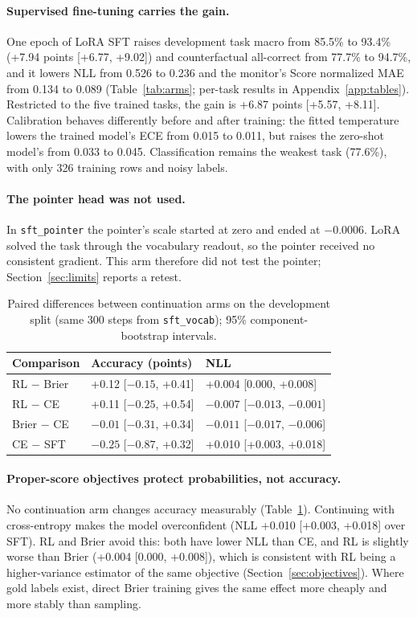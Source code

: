 \paragraph{Supervised fine-tuning carries the gain.}
One epoch of LoRA SFT raises development task macro from 85.5\% to 93.4\% (+7.94 points
[+6.77, +9.02]) and counterfactual all-correct from 77.7\% to 94.7\%, and it lowers NLL from
0.526 to 0.236 and the monitor's Score normalized MAE from 0.134 to 0.089 (Table~\ref{tab:arms};
per-task results in Appendix~\ref{app:tables}). Restricted to the five trained tasks, the
gain is +6.87 points [+5.57, +8.11]. Calibration behaves differently before and after
training: the fitted temperature lowers the trained model's ECE from 0.015 to 0.011, but
raises the zero-shot model's from 0.033 to 0.045. Classification remains the weakest task
(77.6\%), with only 326 training rows and noisy labels.

\paragraph{The pointer head was not used.}
In \texttt{sft\_pointer} the pointer's scale started at zero and ended at $-0.0006$. LoRA solved
the task through the vocabulary readout, so the pointer received no consistent gradient.
This arm therefore did not test the pointer; Section~\ref{sec:limits} reports a retest.

\begin{table}[t]
\centering
\small
\caption{Paired differences between continuation arms on the development split (same 300
steps from \texttt{sft\_vocab}); 95\% component-bootstrap intervals.}
\label{tab:continuation}
\begin{tabular}{@{}lll@{}}
\toprule
Comparison & Accuracy (points) & NLL \\
\midrule
RL $-$ Brier & +0.12 [$-0.15$, +0.41] & +0.004 [0.000, +0.008] \\
RL $-$ CE & +0.11 [$-0.25$, +0.54] & $-0.007$ [$-0.013$, $-0.001$] \\
Brier $-$ CE & $-0.01$ [$-0.31$, +0.34] & $-0.011$ [$-0.017$, $-0.006$] \\
CE $-$ SFT & $-0.25$ [$-0.87$, +0.32] & +0.010 [+0.003, +0.018] \\
\bottomrule
\end{tabular}
\end{table}

\paragraph{Proper-score objectives protect probabilities, not accuracy.}
No continuation arm changes accuracy measurably (Table~\ref{tab:continuation}). Continuing
with cross-entropy makes the model overconfident (NLL +0.010 [+0.003, +0.018] over SFT). RL
and Brier avoid this: both have lower NLL than CE, and RL is slightly worse than Brier
(+0.004 [0.000, +0.008]), which is consistent with RL being a higher-variance estimator of the
same objective (Section~\ref{sec:objectives}). Where gold labels exist, direct Brier training
gives the same effect more cheaply and more stably than sampling.


